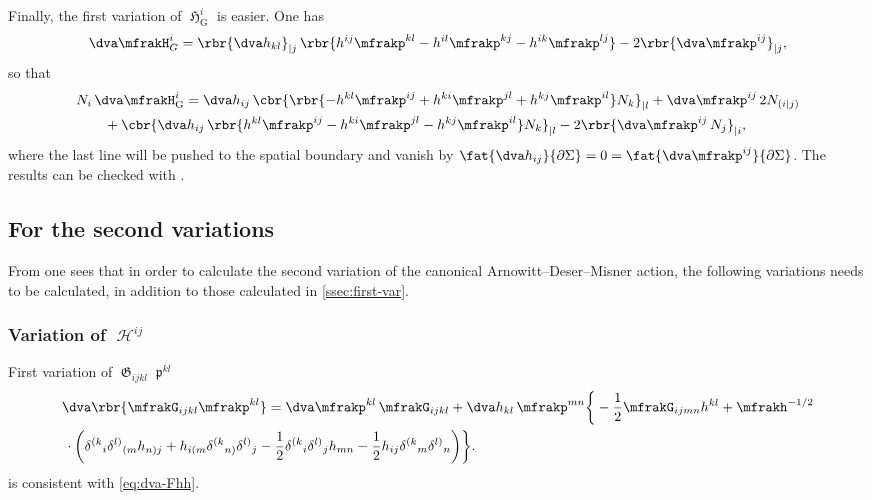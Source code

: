 \documentclass[a4paper,11pt]{article}
\begin{document}
Finally, the first variation of $\mfrakH_\text{G}^i$ is easier. One has
\begin{align}
\dva \mfrakH_G^i = \rbr{\dva h_{kl}}_{|j}\,
\rbr{h^{ij}\mfrakp^{kl} - h^{il}\mfrakp^{kj} - h^{ik}\mfrakp^{lj}}
-2\rbr{\dva \mfrakp^{ij}}_{|j},
\end{align}
so that
\begin{align}
&
N_i\,\dva \mfrakH_\text{G}^i = \dva h_{ij}\,\cbr{\rbr{
-h^{kl}\mfrakp^{ij} + h^{ki}\mfrakp^{jl} + h^{kj}\mfrakp^{il}} N_k}_{|l}
+\dva \mfrakp^{ij}\,2N_{(i|j)}
\nonumber \\
&\qquad
+\cbr{\dva h_{ij}\,\rbr{
h^{kl}\mfrakp^{ij} - h^{ki}\mfrakp^{jl} - h^{kj}\mfrakp^{il}} N_k}_{|l}
- 2\rbr{\dva \mfrakp^{ij}\,N_{j}}_{|i},
\end{align}
where the last line will be pushed to the spatial boundary and vanish by
$\fat{\dva h_{ij}}{\partial\Sigma} = 0 =
\fat{\dva \mfrakp^{ij}}{\partial\Sigma}$. The results can be checked with 
\cite[ch.\ 4.2.7]{Poisson2004}.

\subsection{For the second variations}
\label{ssec:second-var}

From  one sees that in 
order to calculate the second variation of the canonical 
Arnowitt--Deser--Misner action, the following variations needs to be 
calculated, in addition to those calculated in \cref{ssec:first-var}.

\subsubsection{Variation of \texorpdfstring{$\mscrH^{ij}$}{$H^{ij}$}}


First variation of $\mfrakG_{ijkl}\mfrakp^{kl}$
\begin{align}
&\dva\rbr{\mfrakG_{ijkl}\mfrakp^{kl}} =
\dva\mfrakp^{kl}\,\mfrakG_{ijkl}+\dva h_{kl}\,\mfrakp^{mn}
\bigg\{-\frac{1}{2}\mfrakG_{ijmn}h^{kl} + \mfrakh^{-1/2}
\nonumber \\
&\,\cdot\bigg(
\delta^{(k}{}_{i} \delta^{l)}{}_{(m} h_{n)j} +
h_{i(m} \delta^{(k}{}_{n)} \delta^{l)}{}_{j} - \frac{1}{2}
\delta^{(k}{}_{i} \delta^{l)}{}_{j} h_{mn} - \frac{1}{2}
h_{ij} \delta^{(k}{}_{m} \delta^{l)}{}_{n} \bigg)\bigg\}.
\label{eq:dva-Gp}
\end{align}
 is consistent with \cref{eq:dva-Fhh}.
\end{document}

